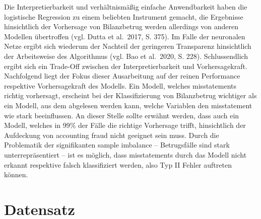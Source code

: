 \documentclass[a4paper, nobind]{templates/ociamthesis}
\begin{document}
Die Interpretierbarkeit und verhältnismäßig einfache Anwendbarkeit haben die logistische Regression zu einem beliebten Instrument gemacht, die Ergebnisse hinsichtlich der Vorhersage von Bilanzbetrug werden allerdings von anderen Modellen übertroffen (vgl. Dutta et al.~2017, S. 375). Im Falle der neuronalen Netze ergibt sich wiederum der Nachteil der geringeren Transparenz hinsichtlich der Arbeitsweise des Algorithmus (vgl. Bao et al.~2020, S. 228). Schlussendlich ergibt sich ein Trade-Off zwischen der Interpretierbarkeit und Vorhersagekraft. Nachfolgend liegt der Fokus dieser Ausarbeitung auf der reinen Performance respektive Vorhersagekraft des Modells. Ein Modell, welches misstatements richtig vorhersagt, erscheint bei der Klassifizierung von Bilanzbetrug wichtiger als ein Modell, aus dem abgelesen werden kann, welche Variablen den misstatement wie stark beeinflussen. An dieser Stelle sollte erwähnt werden, dass auch ein Modell, welches in 99\% der Fälle die richtige Vorhersage trifft, hinsichtlich der Aufdeckung von accounting fraud nicht geeignet sein muss. Durch die Problematik der signifikanten sample imbalance -- Betrugsfälle sind stark unterrepräsentiert -- ist es möglich, dass misstatements durch das Modell nicht erkannt respektive falsch klassifiziert werden, also Typ II Fehler auftreten können.

\hypertarget{dataset}{%
\chapter{Datensatz}\label{dataset}}
\end{document}

